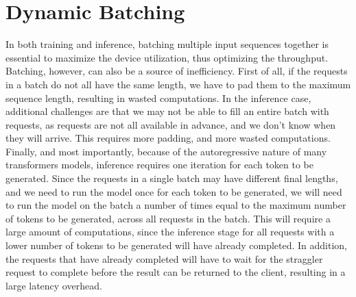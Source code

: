 \section{Dynamic Batching}\label{dynamic-batching}
In both training and inference, batching multiple input sequences together is essential to maximize the device utilization, thus optimizing the throughput. Batching, however, can also be a source of inefficiency. First of all, if the requests in a batch do not all have the same length, we have to pad them to the maximum sequence length, resulting in wasted computations. In the inference case, additional challenges are that we may not be able to fill an entire batch with requests, as requests are not all available in advance, and we don't know when they will arrive. This requires more padding, and more wasted computations. Finally, and most importantly, because of the autoregressive nature of many transformers models, inference requires one iteration for each token to be generated. Since the requests in a single batch may have different final lengths, and we need to run the model once for each token to be generated, we will need to run the model on the batch a number of times equal to the maximum number of tokens to be generated, across all requests in the batch. This will require a large amount of computations, since the inference stage for all requests with a lower number of tokens to be generated will have already completed. In addition, the requests that have already completed will have to wait for the straggler request to complete before the result can be returned to the client, resulting in a large latency overhead.

